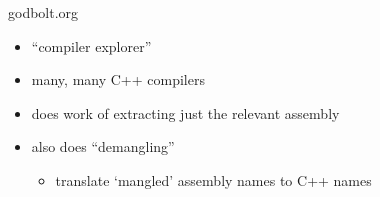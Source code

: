 \begin{frame}{godbolt.org}
    \begin{itemize}
    \item ``compiler explorer''
    \item many, many C++ compilers
    \item does work of extracting just the relevant assembly
    \item also does ``demangling''
            \begin{itemize}
            \item translate `mangled' assembly names to C++ names
            \end{itemize}
    \end{itemize}
\end{frame}
